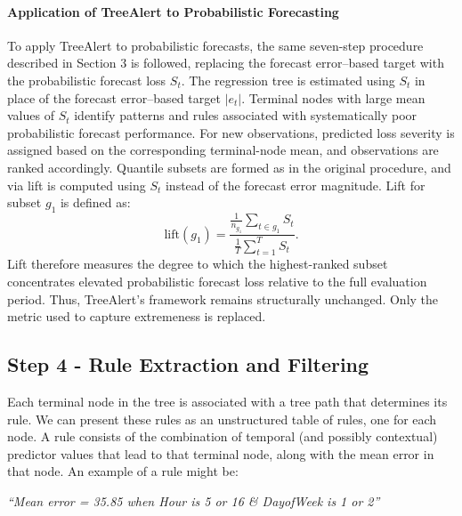 \documentclass[12pt]{article}
\begin{document}
\paragraph{Application of TreeAlert to Probabilistic Forecasting}

To apply TreeAlert to probabilistic forecasts, the same seven-step procedure described in Section 3 is followed, replacing the forecast error–based target with the probabilistic forecast loss $S_t$. %
The regression tree is estimated using $S_t$ in place of the forecast error–based target $|e_t|$. Terminal nodes with large mean values of $S_t$ identify patterns and rules associated with systematically poor probabilistic forecast performance. For new observations, predicted loss severity is assigned based on the corresponding terminal-node mean, and observations are ranked accordingly. Quantile subsets are formed as in the original procedure, and via lift is computed using $S_t$ instead of the forecast error magnitude. Lift for subset $g_{1}$ is defined as: 
\begin{equation}
\text{lift}(g_{1}) =
\frac{
\displaystyle \frac{1}{n_{g_1}} \sum_{t \in g_{1}} S_t
}{
\displaystyle \frac{1}{T} \sum_{t=1}^{T} S_t
}.
\end{equation}
Lift therefore measures the degree to which the highest-ranked subset concentrates elevated probabilistic forecast loss relative to the full evaluation period. Thus, TreeAlert's framework remains structurally unchanged. Only the metric used to capture extremeness is replaced.

\subsection{Step 4 - Rule Extraction and Filtering}
\label{sec:rule-extraction}
Each terminal node in the tree is associated with a tree path that determines its rule. We can present these rules as an unstructured table of rules, one for each node. %
A rule consists of the combination of temporal (and possibly contextual) predictor values that lead to that terminal node, along with the mean error in that node. An example of a rule might be: 
\begin{center}
\textit{``Mean error = 35.85 when Hour is 5 or 16 \& DayofWeek is 1 or 2''}
\end{center}
\end{document}
